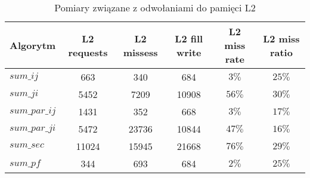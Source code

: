 \begin{table}[H]
\caption{Pomiary związane z odwołaniami do pamięci L2}

\begin{tabular}{|l|c|c|c|c|c|}

\hline
  Algorytm &
  L2 requests &
  L2 missess &
  L2 fill write &
  L2 miss rate &
  L2 miss ratio \\

\hline
  $sum\_ij$ &
  663 &
  340 &
  684 &
  $3\%$ &
  $25\%$ \\

\hline
  $sum\_ji$ &
  5452 &
  7209 &
  10908 &
  $56\%$ &
  $30\%$ \\

\hline
  $sum\_par\_ij$ &
  1431 &
  352 &
  668 &
  $3\%$ &
  $17\%$ \\

\hline
  $sum\_par\_ji$ &
  5472 &
  23736 &
  10844 &
  $47\%$ &
  $16\%$ \\

\hline
  $sum\_sec$ &
  11024 &
  15945 &
  21668 &
  $76\%$ &
  $29\%$ \\

\hline
  $sum\_pf$ &
  344 &
  693 &
  684 &
  $2\%$ &
  $25\%$ \\

\hline

\end{tabular}

\end{table}
